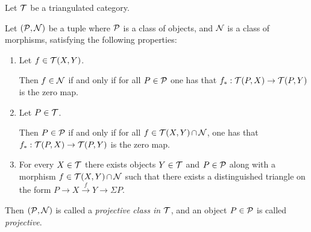 \begin{definition} \label{def:projective_class}
    Let \( {\mathcal{T}} \) be a triangulated category.

    Let \( ({\mathcal{P}}, {\mathcal{N}}) \) be a tuple where \( {\mathcal{P}} \) is a class of objects, and \( {\mathcal{N}} \) is a class of morphisms, satisfying the following properties:

    \begin{enumerate}
        \item {Let \( f \in {\mathcal{T}}(X, Y) \).
        
        Then \( f \in {\mathcal{N}} \) if and only if for all \( P \in {\mathcal{P}} \) one has that \( f_*: {\mathcal{T}}(P, X) \to {\mathcal{T}}(P, Y) \) is the zero map.}

        \item {Let \( P \in {\mathcal{T}} \).
        
        Then \( P \in {\mathcal{P}} \) if and only if for all \( f \in {\mathcal{T}}(X, Y) \mathop{\cap}\limits {\mathcal{N}} \), one has that \( f_*: {\mathcal{T}}(P, X) \to {\mathcal{T}}(P, Y) \) is the zero map.}

        \item {For every \( X \in {\mathcal{T}} \) there exists objects \( Y \in {\mathcal{T}} \) and \( P \in {\mathcal{P}} \) along with a morphism \( f \in {\mathcal{T}}(X, Y) \mathop{\cap}\limits {\mathcal{N}} \) such that there exists a distinguished triangle on the form \( P \to X \stackrel{f}{\to} Y \to \Sigma P \).}
    \end{enumerate}

    Then \( ({\mathcal{P}}, {\mathcal{N}}) \) is called a \emph{projective class in \( {\mathcal{T}} \)}, and an object \( P \in {\mathcal{P}} \) is called \emph{projective}. %
\end{definition}

